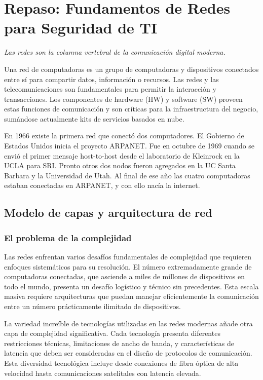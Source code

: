 \chapter{Repaso: Fundamentos de Redes para Seguridad de TI}
\vspace{65px}
\begin{flushright}
    \textit{Las redes son la columna vertebral de la comunicación digital moderna.}
\end{flushright}



Una red de computadoras es un grupo de computadoras y dispositivos conectados entre sí para compartir datos, información o recursos. 
Las redes y las telecomunicaciones son fundamentales para permitir la interacción y transacciones. Los componentes de hardware (HW) y software (SW) proveen estas funciones de comunicación y son críticas para la infraestructura del negocio, sumándose actualmente kits de servicios basados en nube. 

En 1966 existe la primera red que conectó dos computadores. El Gobierno de Estados Unidos inicia el proyecto ARPANET. Fue en octubre de 1969 cuando se envió el primer mensaje host-to-host desde el laboratorio de Kleinrock en la UCLA para SRI. Pronto otros dos nodos fueron agregados en la UC Santa Barbara y la Universidad de Utah. Al final de ese año las cuatro computadoras estaban conectadas en ARPANET, y con ello nacía la internet. 

\section{Modelo de capas y arquitectura de red}

\subsection{El problema de la complejidad}

Las redes enfrentan varios desafíos fundamentales de complejidad que requieren enfoques sistemáticos para su resolución. El número extremadamente grande de computadoras conectadas, que asciende a miles de millones de dispositivos en todo el mundo, presenta un desafío logístico y técnico sin precedentes. Esta escala masiva requiere arquitecturas que puedan manejar eficientemente la comunicación entre un número prácticamente ilimitado de dispositivos.

La variedad increíble de tecnologías utilizadas en las redes modernas añade otra capa de complejidad significativa. Cada tecnología presenta diferentes restricciones técnicas, limitaciones de ancho de banda, y características de latencia que deben ser consideradas en el diseño de protocolos de comunicación. Esta diversidad tecnológica incluye desde conexiones de fibra óptica de alta velocidad hasta comunicaciones satelitales con latencia elevada.

